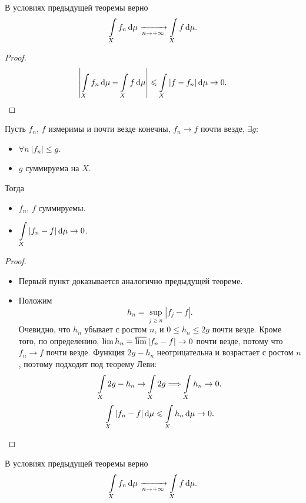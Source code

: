 \begin{corollary}

    В условиях предыдущей теоремы верно
    \[
        \int\limits_{X}{f_n \,\mathrm{d}\mu} \xrightarrow[n \to +\infty]{} \int\limits_{X}{f \,\mathrm{d}\mu}
    .\] 
\end{corollary}
\begin{proof}
    \[
        \left|\int\limits_X{f_n \,\mathrm{d}\mu} - \int\limits_X{f \,\mathrm{d}\mu}\right| \leqslant \int\limits_X{|f-f_n| \,\mathrm{d}\mu} \to 0
    .\]
\end{proof}

\begin{theorem}
    Пусть $f_n$, $f$ измеримы и почти везде конечны, $f_n \to f$ почти везде,
    $\exists g\colon~$
    \begin{itemize}
        \item $\forall n~ |f_n| \leqslant g$.
        \item $g$ суммируема на $X$.
    \end{itemize}
    Тогда
    \begin{itemize}
        \item $f_n$, $f$ суммируемы.
        \item $\displaystyle \int\limits_{X}{|f_n - f| \,\mathrm{d}\mu} \to 0$.
    \end{itemize} 
\end{theorem}
\begin{proof}
    \enewline
    \begin{itemize}
        \item Первый пункт доказывается аналогично предыдущей теореме.
        \item Положим
            \[
                h_n = \sup_{j \geqslant n}{|f_j - f|}
            .\]
            Очевидно, что $h_n$ убывает с ростом $n$, и $0 \leqslant h_n \leqslant 2g$ почти везде.
            Кроме того, по определению, $\lim{h_n} = \varlimsup{|f_n - f|} \to 0$ почти везде, 
            потому что $f_n \to f$ почти везде. Функция $2g - h_n$ неотрицательна и возрастает с ростом 
            $n$, поэтому подходит под теорему Леви:
            \[
                \int\limits_X{2g - h_n} \to \int\limits_X{2g} \Longrightarrow \int\limits_X{h_n} \to 0
            .\]
            \[
                \int\limits_X{|f_n - f| \,\mathrm{d}\mu} \leqslant \int\limits_X{h_n \,\mathrm{d}\mu} \to 0
            .\]
    \end{itemize}
\end{proof}

\begin{corollary}

    В условиях предыдущей теоремы верно
    \[
        \int\limits_{X}{f_n \,\mathrm{d}\mu} \xrightarrow[n \to +\infty]{} \int\limits_{X}{f \,\mathrm{d}\mu}
    .\] 
\end{corollary}

